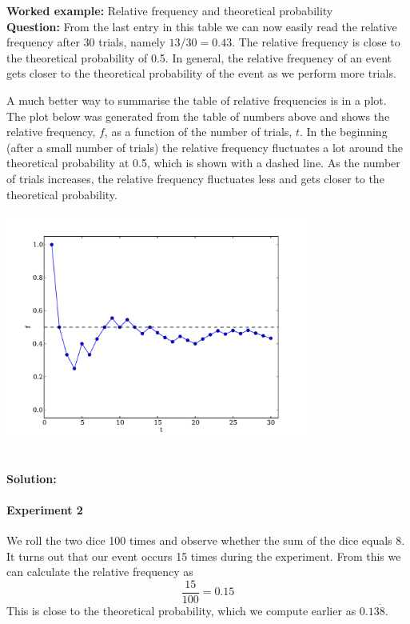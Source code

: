 \documentclass[a4paper,11pt]{report}
\newenvironment{wex}[3]%
{\textbf{Worked example:} #1 \\
\textbf{Question:} #2 \\
\textbf{Solution:} #3}%
{}
\begin{document}
\begin{wex}{Relative frequency and theoretical probability}
{From the last entry in this table we can now easily read the relative
frequency after 30 trials, namely $13/30 = 0.43$. The relative
frequency is close to the theoretical probability of 0.5. In general,
the relative frequency of an event gets closer to the theoretical
probability of the event as we perform more trials.

A much better way to summarise the table of relative frequencies is in
a plot. The plot below was generated from the table
of numbers above and shows the relative frequency, $f$, as a function
of the number of trials, $t$. In the beginning (after a small number
of trials) the relative frequency
fluctuates a lot around the theoretical probability at 0.5, which is shown with
a dashed line. As the number of trials increases, the relative
frequency fluctuates less and gets closer to the theoretical
probability.

\begin{center}
\includegraphics[width=0.75\textwidth]{coin_toss_trials.pdf}
\end{center}
}
\end{wex}

\paragraph{Experiment 2} We roll the two dice 100 times and observe
whether the sum of the dice equals 8. It turns out that our event
occurs 15 times during the experiment. From this we can calculate the
relative frequency as
\[\frac{15}{100}=0.15\]
This is close to the theoretical probability, which we compute earlier
as $0.13\dot{8}$.
\end{document}
